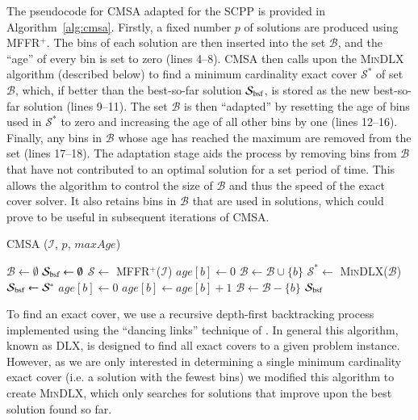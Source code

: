 \documentclass[a4paper,11pt,authoryear]{elsarticle}
\begin{document}
The pseudocode for CMSA adapted for the SCPP is provided in Algorithm~\ref{alg:cmsa}. Firstly, a fixed number $p$ of solutions are produced using MFFR$^+$. The bins of each solution are then inserted into the set $\mathcal{B}$, and the ``age'' of every bin is set to zero (lines 4--8). CMSA then calls upon the \textsc{MinDLX} algorithm (described below) to find a minimum cardinality exact cover $\mathcal{S}^*$ of set $\mathcal{B}$, which, if better than the best-so-far solution $\mathcal{S}_{\textup{bsf}}$, is stored as the new best-so-far solution (lines 9--11). The set $\mathcal{B}$ is then ``adapted'' by resetting the age of bins used in $\mathcal{S}^*$ to zero and increasing the age of all other bins by one (lines 12--16). Finally, any bins in $\mathcal{B}$ whose age has reached the maximum are removed from the set (lines 17--18). The adaptation stage aids the process by removing bins from $\mathcal{B}$ that have not contributed to an optimal solution for a set period of time. This allows the algorithm to control the size of $\mathcal{B}$ and thus the speed of the exact cover solver. It also retains bins in $\mathcal{B}$ that are used in solutions, which could prove to be useful in subsequent iterations of CMSA.

\begin{algorithm}[h!]
\caption{CMSA ($\mathcal{I}$, $p$, $maxAge$)}
\begin{algorithmic}[1]
	\State $\mathcal{B} \gets \emptyset$
	\State $\mathcal{S}_{\textup{bsf}} \gets \emptyset$
			\State $\mathcal{S} \gets$ MFFR$^+$($\mathcal{I}$)
				\State $age[b] \gets 0$
				\State $\mathcal{B} \gets \mathcal{B} \cup \{b\}$
			\EndFor
		\EndFor
		\State $\mathcal{S}^* \gets$ \textsc{MinDLX}($\mathcal{B}$)
			\State $\mathcal{S}_{\textup{bsf}} \gets \mathcal{S}^*$
		\EndIf
				\State $age[b] \gets 0$
				\State $age[b] \gets age[b] + 1$
					\State $\mathcal{B} \gets \mathcal{B} - \{b\}$
				\EndIf
			\EndIf		
		\EndFor
	\EndWhile
	\Return $\mathcal{S}_{\textup{bsf}}$
\end{algorithmic}
\label{alg:cmsa}	
\end{algorithm}	

\noindent To find an exact cover, we use a recursive depth-first backtracking process implemented using the ``dancing links'' technique of \cite{knuth2000}. In general this algorithm, known as DLX, is designed to find all exact covers to a given problem instance. However, as we are only interested in determining a single minimum cardinality exact cover (i.e. a solution with the fewest bins) we modified this algorithm to create \textsc{MinDLX}, which only searches for solutions that improve upon the best solution found so far.
\end{document}
